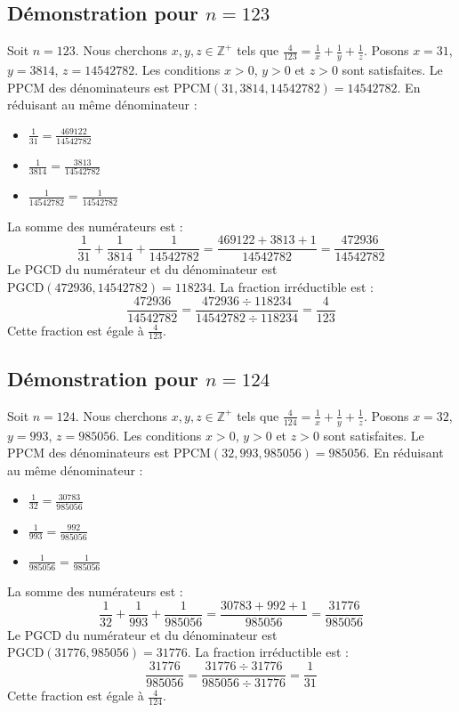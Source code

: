\documentclass[11pt,a4paper]{article}
\begin{document}
\subsection{Démonstration pour $n = 123$}
Soit $n = 123$. Nous cherchons $x, y, z \in \mathbb{Z}^{+}$ tels que $\frac{4}{123} = \frac{1}{x} + \frac{1}{y} + \frac{1}{z}$.
Posons $x = 31$, $y = 3814$, $z = 14542782$.
Les conditions $x > 0$, $y > 0$ et $z > 0$ sont satisfaites.
Le PPCM des dénominateurs est $\text{PPCM}(31, 3814, 14542782) = 14542782$.
En réduisant au même dénominateur :
\begin{itemize}
    \item $\frac{1}{31} = \frac{469122}{14542782}$
    \item $\frac{1}{3814} = \frac{3813}{14542782}$
    \item $\frac{1}{14542782} = \frac{1}{14542782}$
\end{itemize}
La somme des numérateurs est :
$$ \frac{1}{31} + \frac{1}{3814} + \frac{1}{14542782} = \frac{469122 + 3813 + 1}{14542782} = \frac{472936}{14542782} $$
Le PGCD du numérateur et du dénominateur est $\text{PGCD}(472936, 14542782) = 118234$.
La fraction irréductible est :
$$ \frac{472936}{14542782} = \frac{472936 \div 118234}{14542782 \div 118234} = \frac{4}{123} $$
Cette fraction est égale à $\frac{4}{123}$.

\subsection{Démonstration pour $n = 124$}
Soit $n = 124$. Nous cherchons $x, y, z \in \mathbb{Z}^{+}$ tels que $\frac{4}{124} = \frac{1}{x} + \frac{1}{y} + \frac{1}{z}$.
Posons $x = 32$, $y = 993$, $z = 985056$.
Les conditions $x > 0$, $y > 0$ et $z > 0$ sont satisfaites.
Le PPCM des dénominateurs est $\text{PPCM}(32, 993, 985056) = 985056$.
En réduisant au même dénominateur :
\begin{itemize}
    \item $\frac{1}{32} = \frac{30783}{985056}$
    \item $\frac{1}{993} = \frac{992}{985056}$
    \item $\frac{1}{985056} = \frac{1}{985056}$
\end{itemize}
La somme des numérateurs est :
$$ \frac{1}{32} + \frac{1}{993} + \frac{1}{985056} = \frac{30783 + 992 + 1}{985056} = \frac{31776}{985056} $$
Le PGCD du numérateur et du dénominateur est $\text{PGCD}(31776, 985056) = 31776$.
La fraction irréductible est :
$$ \frac{31776}{985056} = \frac{31776 \div 31776}{985056 \div 31776} = \frac{1}{31} $$
Cette fraction est égale à $\frac{4}{124}$.
\end{document}
